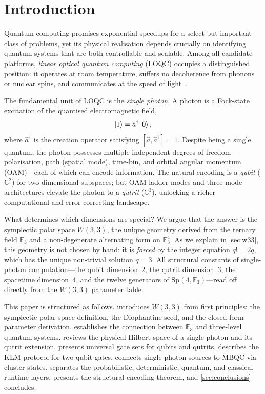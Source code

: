 ﻿\documentclass[12pt]{article}
\newcommand{\FF}{\mathbb{F}}
\newcommand{\CC}{\mathbb{C}}
\newcommand{\Sp}{\mathrm{Sp}}
\newcommand{\GF}[1]{\mathbb{F}_{#1}}
\begin{document}
\section{Introduction}

Quantum computing promises exponential speedups for a select but important class of
problems, yet its physical realisation depends crucially on identifying quantum systems
that are both controllable and scalable.  Among all candidate platforms, \emph{linear
optical quantum computing} (LOQC) occupies a distinguished position: it operates at
room temperature, suffers no decoherence from phonons or nuclear spins, and
communicates at the speed of light~\cite{KLM2001}.

The fundamental unit of LOQC is the \emph{single photon}.  A photon is a Fock-state
excitation of the quantised electromagnetic field,
\begin{equation}
  \ket{1} = \hat{a}^\dagger \ket{0},
  \label{eq:fock}
\end{equation}
where $\hat{a}^\dagger$ is the creation operator satisfying
$[\hat{a},\hat{a}^\dagger]=1$.  Despite being a single quantum, the photon possesses
multiple independent degrees of freedom---polarisation, path (spatial mode), time-bin,
and orbital angular momentum (OAM)---each of which can encode information.  The
natural encoding is a \emph{qubit} ($\CC^2$) for two-dimensional subspaces; but OAM
ladder modes and three-mode architectures elevate the photon to a \emph{qutrit}
($\CC^3$), unlocking a richer computational and error-correcting landscape.

What determines which dimensions are special?  We argue that the answer is the
symplectic polar space $W(3,3)$, the unique geometry derived from the ternary field
$\GF{3}$ and a non-degenerate alternating form on $\GF{3}^4$.  As we explain in
\cref{sec:w33}, this geometry is not chosen by hand: it is \emph{forced} by the
integer equation $q! = 2q$, which has the unique non-trivial solution $q = 3$.
All structural constants of single-photon computation---the qubit dimension~$2$, the
qutrit dimension~$3$, the spacetime dimension~$4$, and the twelve generators of
$\Sp(4,\FF_3)$---read off directly from the $W(3,3)$ parameter table.

This paper is structured as follows.   introduces $W(3,3)$ from first
principles: the symplectic polar space definition, the Diophantine seed, and the
closed-form parameter derivation.   establishes the connection
between $\GF{3}$ and three-level quantum systems.   reviews the
physical Hilbert space of a single photon and its qutrit extension.
 presents universal gate sets for qubits and qutrits.
 describes the KLM protocol for two-qubit gates.  
connects single-photon sources to MBQC via cluster states.  
separates the probabilistic, deterministic, quantum, and classical runtime layers.
 presents the structural encoding theorem, and
\cref{sec:conclusions} concludes.
\end{document}
